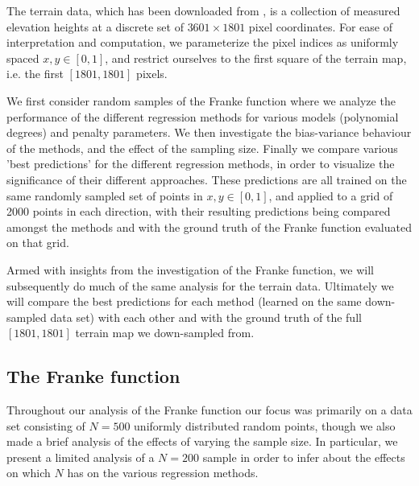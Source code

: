 \documentclass[reprint, english, nofootinbib]{revtex4-2}
\begin{document}
The terrain data, which has been downloaded from \cite{4155_repo}, is a collection of measured elevation heights at a discrete set of $3601\times1801$ pixel coordinates. For ease of interpretation and computation, we parameterize the pixel indices as uniformly spaced $x,y \in [0,1]$, and restrict ourselves to the first square of the terrain map, i.e. the first $[1801,1801]$ pixels.

We first consider random samples of the Franke function where we analyze the performance of the different regression methods for various models (polynomial degrees) and penalty parameters. We then investigate the bias-variance behaviour of the methods, and the effect of the sampling size.  Finally we compare various 'best predictions' for the different regression methods, in order to visualize the significance of their different approaches. These predictions are all trained on the same randomly sampled set of points in $x,y \in [0,1]$, and applied to a grid of 2000 points in each direction, with their resulting predictions being compared amongst the methods and with the ground truth of the Franke function evaluated on that grid.

Armed with insights from the investigation of the Franke function, we will subsequently do much of the same analysis for the terrain data. Ultimately we will compare the best predictions for each method (learned on the same down-sampled data set) with each other and with the ground truth of the full $[1801,1801]$ terrain map we down-sampled from.

\subsection{The Franke function}

\noindent
Throughout our analysis of the Franke function our focus was primarily on a data set consisting of $N=500$ uniformly distributed random points, though we also made a brief analysis of the effects of varying the sample size. In particular, we present a limited analysis of a $N=200$ sample in order to infer about the effects on which $N$ has on the various regression methods.
\end{document}
